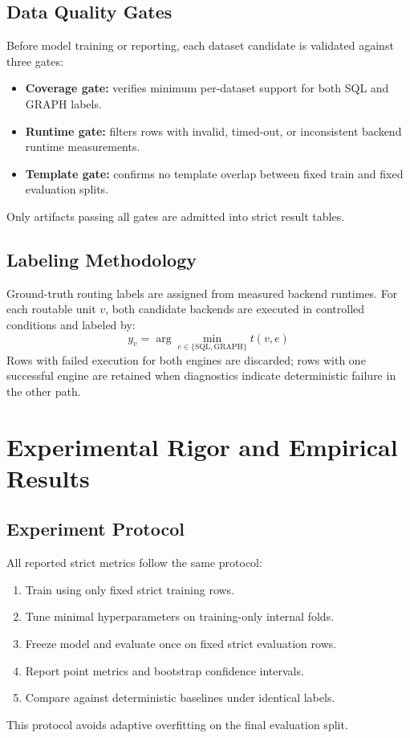 \documentclass[conference]{IEEEtran}
\begin{document}
\subsection{Data Quality Gates}
Before model training or reporting, each dataset candidate is validated against three gates:
\begin{itemize}[leftmargin=*]
\item \textbf{Coverage gate:} verifies minimum per-dataset support for both SQL and GRAPH labels.
\item \textbf{Runtime gate:} filters rows with invalid, timed-out, or inconsistent backend runtime measurements.
\item \textbf{Template gate:} confirms no template overlap between fixed train and fixed evaluation splits.
\end{itemize}
Only artifacts passing all gates are admitted into strict result tables.

\subsection{Labeling Methodology}
Ground-truth routing labels are assigned from measured backend runtimes. For each routable unit $v$, both candidate backends are executed in controlled conditions and labeled by:
\begin{equation}
y_v = \arg\min_{e \in \{\text{SQL},\text{GRAPH}\}} t(v,e)
\end{equation}
Rows with failed execution for both engines are discarded; rows with one successful engine are retained when diagnostics indicate deterministic failure in the other path.

\section{Experimental Rigor and Empirical Results}

\subsection{Experiment Protocol}
All reported strict metrics follow the same protocol:
\begin{enumerate}[leftmargin=*]
\item Train using only fixed strict training rows.
\item Tune minimal hyperparameters on training-only internal folds.
\item Freeze model and evaluate once on fixed strict evaluation rows.
\item Report point metrics and bootstrap confidence intervals.
\item Compare against deterministic baselines under identical labels.
\end{enumerate}
This protocol avoids adaptive overfitting on the final evaluation split.
\end{document}
